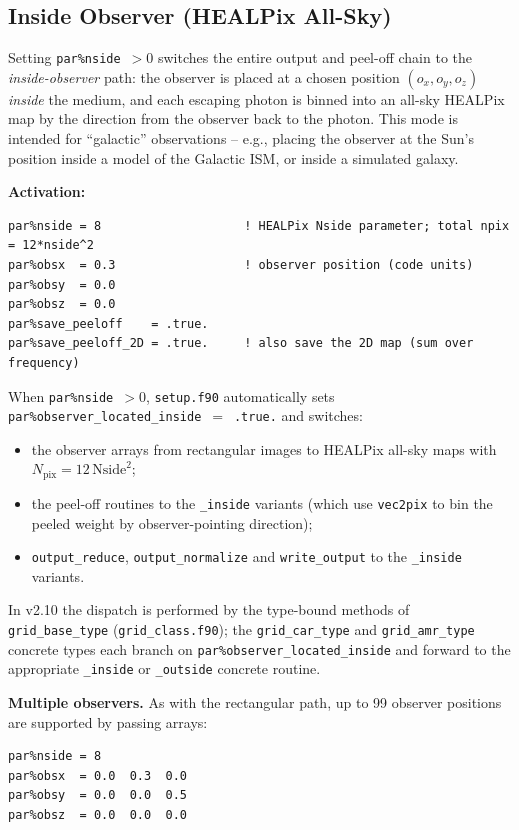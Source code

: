 \documentclass[english,a4paper]{my_memo}
\newcommand{\parm}[1]{\texttt{par\%#1}}
\begin{document}
\subsection{Inside Observer (HEALPix All-Sky)}
\label{sec:inside_observer}

Setting \parm{nside}~$> 0$ switches the entire output and peel-off chain
to the \emph{inside-observer} path: the observer is placed at a chosen
position $(o_x, o_y, o_z)$ \emph{inside} the medium, and each escaping
photon is binned into an all-sky HEALPix map by the direction from the
observer back to the photon.  This mode is intended for ``galactic''
observations -- e.g., placing the observer at the Sun's position inside
a model of the Galactic ISM, or inside a simulated galaxy.

\textbf{Activation:}
\begin{lstlisting}
par%nside = 8                    ! HEALPix Nside parameter; total npix = 12*nside^2
par%obsx  = 0.3                  ! observer position (code units)
par%obsy  = 0.0
par%obsz  = 0.0
par%save_peeloff    = .true.
par%save_peeloff_2D = .true.     ! also save the 2D map (sum over frequency)
\end{lstlisting}

When \parm{nside}~$> 0$, \texttt{setup.f90} automatically sets
\parm{observer\_located\_inside}~$=$~\texttt{.true.} and switches:
\begin{itemize}
  \item the observer arrays from rectangular images to HEALPix
        all-sky maps with $N_\mathrm{pix} = 12\,\mathrm{Nside}^2$;
  \item the peel-off routines to the \texttt{\_inside} variants
        (which use \texttt{vec2pix} to bin the peeled weight by
        observer-pointing direction);
  \item \texttt{output\_reduce}, \texttt{output\_normalize} and
        \texttt{write\_output} to the \texttt{\_inside} variants.
\end{itemize}
In v2.10 the dispatch is performed by the type-bound methods of
\texttt{grid\_base\_type} (\texttt{grid\_class.f90}); the
\texttt{grid\_car\_type} and \texttt{grid\_amr\_type} concrete types
each branch on \parm{observer\_located\_inside} and forward to the
appropriate \texttt{\_inside} or \texttt{\_outside} concrete routine.

\textbf{Multiple observers.}  As with the rectangular path, up to 99
observer positions are supported by passing arrays:
\begin{lstlisting}
par%nside = 8
par%obsx  = 0.0  0.3  0.0
par%obsy  = 0.0  0.0  0.5
par%obsz  = 0.0  0.0  0.0
\end{lstlisting}
\end{document}
